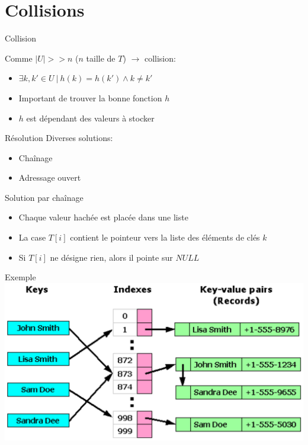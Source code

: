 \documentclass{beamer}
\begin{document}
  \section{Collisions}

  \begin{frame}{Collision}

    Comme $|U| >> n$ ($n$ taille de $T$) $\rightarrow$ collision:
    \begin{itemize}
      \item{$\exists k, k' \in U\ |\ h(k) = h(k') \land k \ne k'$}
    \end{itemize}

    \begin{itemize}
      \item{Important de trouver la bonne fonction $h$}
      \item{$h$ est dépendant des valeurs à stocker}
    \end{itemize}

  \end{frame}

  \begin{frame}{Résolution}
    Diverses solutions:
    \begin{itemize}
      \item{Chaînage}
      \item{Adressage ouvert}
    \end{itemize}
    \begin{block}{Solution par chaînage}
      \begin{itemize}
        \item{Chaque valeur hachée est placée dans une liste}
        \item{La case $T[i]$ contient le pointeur vers la liste des éléments de clés $k$}
        \item{Si $T[i]$ ne désigne rien, alors il pointe sur $NULL$}
      \end{itemize}
    \end{block}
  \end{frame}

  \begin{frame}{Exemple}
    \includegraphics[scale=0.7]{./imgs/keyval2.eps}
  \end{frame}
\end{document}
